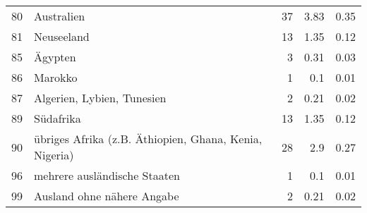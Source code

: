 \begin{longtable}{lXrrr}
        80 & \multicolumn{1}{X}{Australien} & %
          \num{37} &
          \num[round-mode=places,round-precision=2]{3,83} &
          \num[round-mode=places,round-precision=2]{0,35} \\

        81 & \multicolumn{1}{X}{Neuseeland} & %
          \num{13} &
          \num[round-mode=places,round-precision=2]{1,35} &
          \num[round-mode=places,round-precision=2]{0,12} \\

        85 & \multicolumn{1}{X}{Ägypten} & %
          \num{3} &
          \num[round-mode=places,round-precision=2]{0,31} &
          \num[round-mode=places,round-precision=2]{0,03} \\

        86 & \multicolumn{1}{X}{Marokko} & %
          \num{1} &
          \num[round-mode=places,round-precision=2]{0,1} &
          \num[round-mode=places,round-precision=2]{0,01} \\

        87 & \multicolumn{1}{X}{Algerien, Lybien, Tunesien} & %
          \num{2} &
          \num[round-mode=places,round-precision=2]{0,21} &
          \num[round-mode=places,round-precision=2]{0,02} \\

        89 & \multicolumn{1}{X}{Südafrika} & %
          \num{13} &
          \num[round-mode=places,round-precision=2]{1,35} &
          \num[round-mode=places,round-precision=2]{0,12} \\

        90 & \multicolumn{1}{X}{übriges Afrika (z.B. Äthiopien, Ghana, Kenia, Nigeria)} & %
          \num{28} &
          \num[round-mode=places,round-precision=2]{2,9} &
          \num[round-mode=places,round-precision=2]{0,27} \\

        96 & \multicolumn{1}{X}{mehrere ausländische Staaten} & %
          \num{1} &
          \num[round-mode=places,round-precision=2]{0,1} &
          \num[round-mode=places,round-precision=2]{0,01} \\

        99 & \multicolumn{1}{X}{Ausland ohne nähere Angabe} & %
          \num{2} &
          \num[round-mode=places,round-precision=2]{0,21} &
          \num[round-mode=places,round-precision=2]{0,02} \\


\end{longtable}
